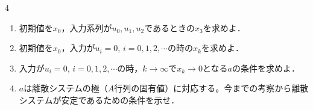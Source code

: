 \documentclass[fleqn]{article}
\begin{document}
\begin{multicols}{4}
\begin{enumerate}
\begin{enumerate}

\item
初期値を$x_0$，入力系列が$u_0,u_1,u_2$であるときの$x_3$を求めよ．
\vspace{5.5cm}

\item
初期値を$x_0$，入力が$u_i=0$, $i=0,1,2,\cdots$の時の$x_k$を求めよ．
\vspace{5.5cm}


\item
入力が$u_i=0$, $i=0,1,2,\cdots$の時，$k \rightarrow \infty$で$x_k \rightarrow 0$となる$a$の条件を求めよ．
\vspace{5.5cm}

\item
$a$は離散システムの極（$A$行列の固有値）に対応する。今までの考察から離散システムが安定であるための条件を示せ．
\vspace{5.5cm}



\end{enumerate}




\end{enumerate}
\end{multicols}
\end{document}
